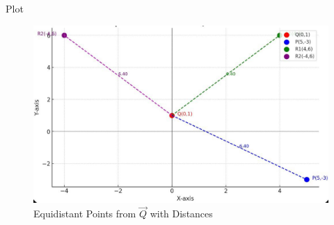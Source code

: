 \documentclass{beamer}
\begin{document}
\begin{frame}{Plot}
   \begin{figure}[H]
\centering
\includegraphics[width=1\columnwidth]{figs/graph.png}
 \caption*{Equidistant Points from $\vec{Q}$ with Distances}
\label{fig:graph.png}
\end{figure}
\end{frame}
\end{document}

